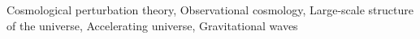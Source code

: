 \documentclass[twocolumn]{aastex631}
\begin{document}
Cosmological perturbation theory, Observational cosmology, Large-scale structure of the universe, Accelerating universe, Gravitational waves
\end{document}
